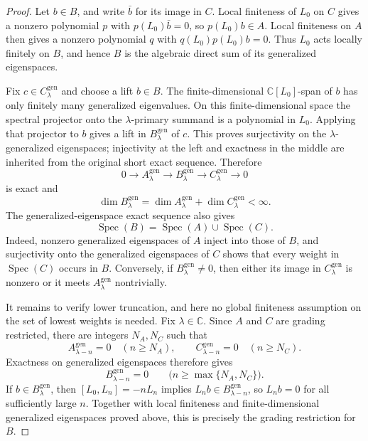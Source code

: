 \documentclass[12pt,leqno]{amsart}
\numberwithin{equation}{section}
\def\C{\mathbb{C}}
\begin{document}
\begin{proof}
Let $b\in B$, and write $\bar b$ for its image in $C$.  Local finiteness
of $L_0$ on $C$ gives a nonzero polynomial $p$ with
$p(L_0)\bar b=0$, so $p(L_0)b\in A$.  Local finiteness on $A$ then gives a
nonzero polynomial $q$ with $q(L_0)p(L_0)b=0$.  Thus $L_0$ acts locally
finitely on $B$, and hence $B$ is the algebraic direct sum of its generalized
eigenspaces.

Fix $c\in C^{\mathrm{gen}}_\lambda$ and choose a lift $b\in B$.  The
finite-dimensional $\C[L_0]$-span of $b$ has only finitely many generalized
eigenvalues.  On this finite-dimensional space the spectral projector onto
the $\lambda$-primary summand is a polynomial in $L_0$.  Applying that
projector to $b$ gives a lift in $B^{\mathrm{gen}}_\lambda$ of $c$.  This
proves surjectivity on the $\lambda$-generalized eigenspaces; injectivity at
the left and exactness in the middle are inherited from the original short
exact sequence.  Therefore
\[
 0\longrightarrow A^{\mathrm{gen}}_\lambda
 \longrightarrow B^{\mathrm{gen}}_\lambda
 \longrightarrow C^{\mathrm{gen}}_\lambda\longrightarrow0
\]
is exact and
\[
 \dim B^{\mathrm{gen}}_\lambda
 =\dim A^{\mathrm{gen}}_\lambda+\dim C^{\mathrm{gen}}_\lambda<\infty.
\]
The generalized-eigenspace exact sequence also gives
\[
 \operatorname{Spec}(B)=\operatorname{Spec}(A)\cup\operatorname{Spec}(C).
\]
Indeed, nonzero generalized eigenspaces of $A$ inject into those of $B$,
and surjectivity onto the generalized eigenspaces of $C$ shows that every
weight in $\operatorname{Spec}(C)$ occurs in $B$.  Conversely, if
$B^{\mathrm{gen}}_\lambda\ne0$, then either its image in
$C^{\mathrm{gen}}_\lambda$ is nonzero or it meets
$A^{\mathrm{gen}}_\lambda$ nontrivially.

It remains to verify lower truncation, and here no global finiteness
assumption on the set of lowest weights is needed.  Fix $\lambda\in\C$.
Since $A$ and $C$ are grading restricted, there are integers $N_A,N_C$
such that
\[
 A^{\mathrm{gen}}_{\lambda-n}=0\quad(n\ge N_A),
 \qquad
 C^{\mathrm{gen}}_{\lambda-n}=0\quad(n\ge N_C).
\]
Exactness on generalized eigenspaces therefore gives
\[
 B^{\mathrm{gen}}_{\lambda-n}=0
 \qquad\bigl(n\ge\max\{N_A,N_C\}\bigr).
\]
If $b\in B^{\mathrm{gen}}_\lambda$, then $[L_0,L_n]=-nL_n$ implies
$L_nb\in B^{\mathrm{gen}}_{\lambda-n}$, so $L_nb=0$ for all sufficiently
large $n$.  Together with local finiteness and finite-dimensional
generalized eigenspaces proved above, this is precisely the grading
restriction for $B$.
\end{proof}
\end{document}
